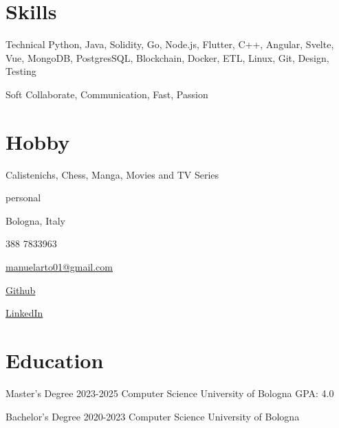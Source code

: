 \documentclass{tccv}
\begin{document}
\section{Skills}

\begin{factlist}

\item{Technical}
     {Python, Java, Solidity, Go, Node.js, Flutter, C++, Angular, Svelte, Vue, MongoDB, PostgresSQL, Blockchain, Docker, ETL, Linux, Git, Design, Testing}

\item{Soft}
     {Collaborate, Communication, Fast, Passion}

\end{factlist}

\section{Hobby}

Calistenichs, Chess, Manga, Movies and TV Series

\newpage

\begin{keyvaluelist}{personal}
    \item[\faHome] Bologna, Italy
    \item[\faPhone] 388 7833963
    \item[\faEnvelope] \href{mailto:manuelarto01@gmail.com}{manuelarto01@gmail.com}
    \item[\faGithub] \href{https://github.com/manuelarto}{Github}
    \item[\faLinkedin] \href{https://www.linkedin.com/in/manuel-arto-696012203/}{LinkedIn}
\end{keyvaluelist}

\section{Education}

\begin{yearlist}

\item[Master's Degree]{2023-2025}
     {Computer Science}
     {University of Bologna \newline GPA: 4.0}

\item[Bachelor's Degree]{2020-2023}
    {Computer Science}
    {University of Bologna}

\end{yearlist}
\end{document}
